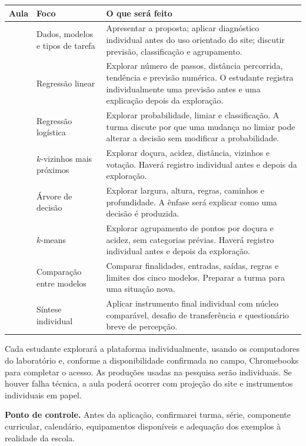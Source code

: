 \documentclass[11pt,a4paper]{article}
\newcommand{\titulo}[1]{\vspace{7pt}{\large\bfseries\color{azul}#1}\par\vspace{2pt}}
\newcommand{\caixa}[1]{\begingroup\setlength{\fboxsep}{8pt}\colorbox{azulclaro}{\parbox{\dimexpr\linewidth-2\fboxsep\relax}{#1}}\endgroup}
\begin{document}
\small
\begin{tabularx}{\textwidth}{>{\centering\arraybackslash}p{1.15cm} >{\raggedright\arraybackslash}p{3.2cm} X}
\toprule
\textbf{Aula} & \textbf{Foco} & \textbf{O que será feito} \\
\midrule
1 & Dados, modelos e tipos de tarefa & Apresentar a proposta; aplicar diagnóstico individual antes do uso orientado do site; discutir previsão, classificação e agrupamento. \\
\addlinespace
2 & Regressão linear & Explorar número de passos, distância percorrida, tendência e previsão numérica. O estudante registra individualmente uma previsão antes e uma explicação depois da exploração. \\
\addlinespace
3 & Regressão logística & Explorar probabilidade, limiar e classificação. A turma discute por que uma mudança no limiar pode alterar a decisão sem modificar a probabilidade. \\
\addlinespace
4 & $k$-vizinhos mais próximos & Explorar doçura, acidez, distância, vizinhos e votação. Haverá registro individual antes e depois da exploração. \\
\addlinespace
5 & Árvore de decisão & Explorar largura, altura, regras, caminhos e profundidade. A ênfase será explicar como uma decisão é produzida. \\
\addlinespace
6 & $k$-means & Explorar agrupamento de pontos por doçura e acidez, sem categorias prévias. Haverá registro individual antes e depois da exploração. \\
\addlinespace
7 & Comparação entre modelos & Comparar finalidades, entradas, saídas, regras e limites dos cinco modelos. Preparar a turma para uma situação nova. \\
\addlinespace
8 & Síntese individual & Aplicar instrumento final individual com núcleo comparável, desafio de transferência e questionário breve de percepção. \\
\bottomrule
\end{tabularx}
\normalsize

\titulo{Organização em sala}

Cada estudante explorará a plataforma individualmente, usando os computadores do laboratório e, conforme a disponibilidade confirmada no campo, Chromebooks para completar o acesso. As produções usadas na pesquisa serão individuais. Se houver falha técnica, a aula poderá ocorrer com projeção do site e instrumentos individuais em papel.

\caixa{\textbf{Ponto de controle.} Antes da aplicação, confirmarei turma, série, componente curricular, calendário, equipamentos disponíveis e adequação dos exemplos à realidade da escola.}
\end{document}
